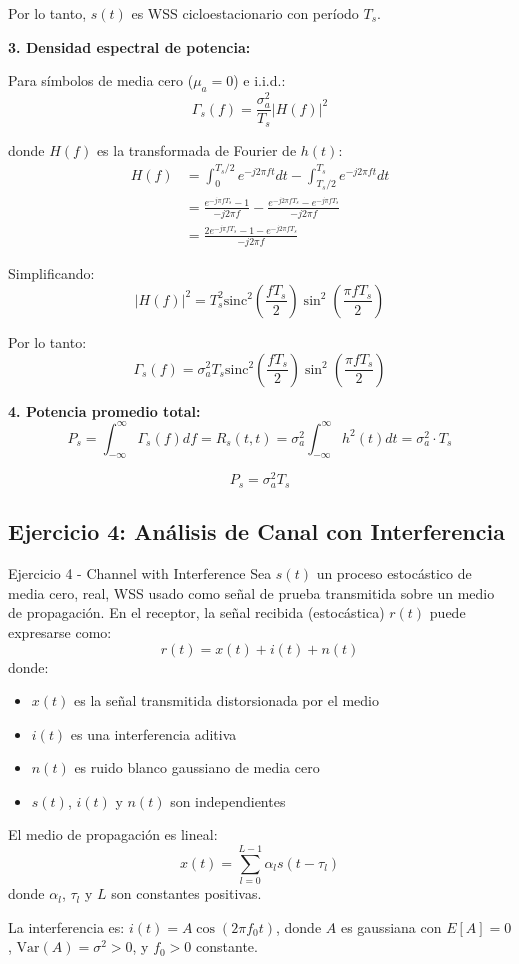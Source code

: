 \documentclass[10pt,a4paper]{article}
\begin{document}
\begin{solucion}
Por lo tanto, $s(t)$ es WSS cicloestacionario con período $T_s$.

\textbf{3. Densidad espectral de potencia:}

Para símbolos de media cero ($\mu_a = 0$) e i.i.d.:
\[
\Gamma_s(f) = \frac{\sigma_a^2}{T_s} |H(f)|^2
\]

donde $H(f)$ es la transformada de Fourier de $h(t)$:
\begin{align*}
H(f) &= \int_0^{T_s/2} e^{-j2\pi ft} dt - \int_{T_s/2}^{T_s} e^{-j2\pi ft} dt\\
&= \frac{e^{-j\pi fT_s} - 1}{-j2\pi f} - \frac{e^{-j2\pi fT_s} - e^{-j\pi fT_s}}{-j2\pi f}\\
&= \frac{2e^{-j\pi fT_s} - 1 - e^{-j2\pi fT_s}}{-j2\pi f}
\end{align*}

Simplificando:
\[
|H(f)|^2 = T_s^2 \text{sinc}^2\left(\frac{fT_s}{2}\right) \sin^2\left(\frac{\pi fT_s}{2}\right)
\]

Por lo tanto:
\[
\boxed{\Gamma_s(f) = \sigma_a^2 T_s \text{sinc}^2\left(\frac{fT_s}{2}\right) \sin^2\left(\frac{\pi fT_s}{2}\right)}
\]

\textbf{4. Potencia promedio total:}
\[
P_s = \int_{-\infty}^{\infty} \Gamma_s(f) df = R_s(t,t) = \sigma_a^2 \int_{-\infty}^{\infty} h^2(t) dt = \sigma_a^2 \cdot T_s
\]

\[
\boxed{P_s = \sigma_a^2 T_s}
\]
\end{solucion}

\newpage
\subsection{Ejercicio 4: Análisis de Canal con Interferencia}

\begin{ejercicio}{Ejercicio 4 - Channel with Interference}
Sea $s(t)$ un proceso estocástico de media cero, real, WSS usado como señal de prueba transmitida sobre un medio de propagación. En el receptor, la señal recibida (estocástica) $r(t)$ puede expresarse como:
\[
r(t) = x(t) + i(t) + n(t)
\]
donde:
\begin{itemize}
\item $x(t)$ es la señal transmitida distorsionada por el medio
\item $i(t)$ es una interferencia aditiva
\item $n(t)$ es ruido blanco gaussiano de media cero
\item $s(t)$, $i(t)$ y $n(t)$ son independientes
\end{itemize}

El medio de propagación es lineal:
\[
x(t) = \sum_{l=0}^{L-1} \alpha_l s(t - \tau_l)
\]
donde $\alpha_l$, $\tau_l$ y $L$ son constantes positivas.

La interferencia es: $i(t) = A \cos(2\pi f_0 t)$, donde $A$ es gaussiana con $E[A] = 0$, $\text{Var}(A) = \sigma^2 > 0$, y $f_0 > 0$ constante.
\end{ejercicio}
\end{document}
